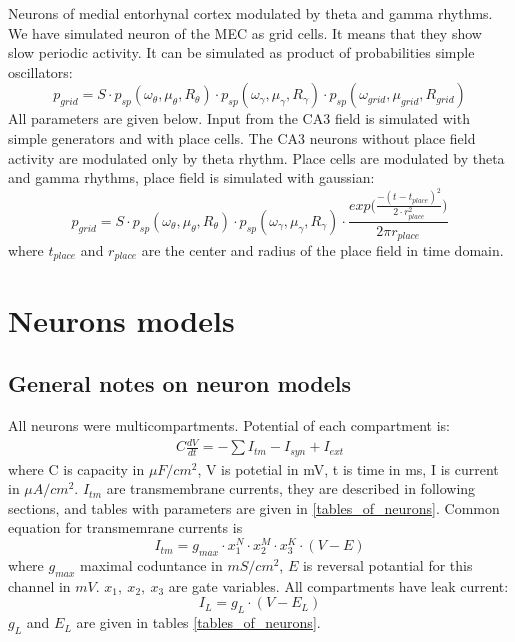 \documentclass[a4paper,12pt]{article}
\begin{document}
Neurons of medial entorhynal cortex modulated by theta and gamma rhythms. We have simulated neuron of the MEC as grid cells. It means that they show slow periodic activity. It can be simulated as product of probabilities simple oscillators:  
\begin{equation}
p_{grid} = S \cdot p_{sp}(\omega_{\theta}, \mu_{\theta}, R_{\theta}) \cdot  p_{sp}(\omega_{\gamma}, \mu_{\gamma}, R_{\gamma}) \cdot  p_{sp}(\omega_{grid}, \mu_{grid}, R_{grid})
\end{equation}
All parameters are given below.
Input from the CA3 field is simulated with simple generators and with place cells. The CA3 neurons without place field activity are modulated only by theta rhythm. Place cells are modulated by theta and gamma rhythms, place field is simulated with gaussian:  
\begin{equation}
p_{grid} = S \cdot p_{sp}(\omega_{\theta}, \mu_{\theta}, R_{\theta}) \cdot  p_{sp}(\omega_{\gamma}, \mu_{\gamma}, R_{\gamma}) \cdot 
\frac{exp \Big( \frac{-(t - t_{place})^2}{2 \cdot r_{place}^2}  \Big)}{2 \pi r_{place}}  
\end{equation}
where $t_{place}$ and $r_{place}$ are the center and radius of the place field in time domain.







\section{Neurons models}
\subsection{General notes on neuron models}
All neurons were multicompartments. Potential of each compartment is: 
\begin{eqnarray}
\label{eq:comon_potential}
C\frac{dV}{dt}=-\sum{I_{tm}}-I_{syn} + I_{ext}
\end{eqnarray}
where C is capacity in $\mu F/ cm^2$, V is potetial in mV, t is time in ms, I is current in $\mu A/cm^2$. $I_{tm}$ are transmembrane currents, they are described in following sections, and tables with parameters are given in \ref{tables_of_neurons}. Common equation for transmemrane currents is
\begin{equation}
I_{tm}= g_{max}\cdot x_1^N\cdot x_2^M \cdot x_3^K \cdot (V-E)
\end{equation}
where $ g_{max}$ maximal coduntance in $mS/ cm^2$, $E$ is reversal potantial for this channel in $mV$. $x_1,\ x_2, \ x_3$ are gate variables. All compartments have leak current:
\begin{equation}
I_{L}= g_{L} \cdot (V - E_{L})
\end{equation}
$g_{L}$ and $E_{L}$ are given in tables \ref{tables_of_neurons}.
\end{document}
